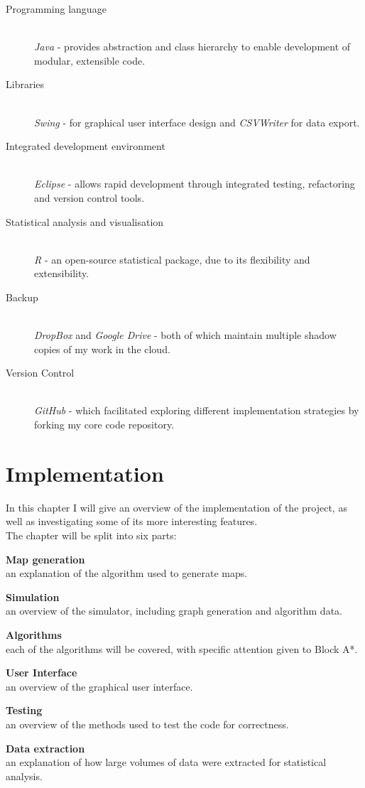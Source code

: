 \documentclass[12pt,notitlepage]{report}
\begin{document}
\begin{description}
  \item[Programming language] \hfill \\
  {\em Java} - provides abstraction and class hierarchy to enable development of modular, extensible code.
  \item[Libraries] \hfill \\
  {\em Swing} - for graphical user interface design and {\em CSVWriter} for data export.
  \item[Integrated development environment] \hfill \\
  {\em Eclipse} - allows rapid development through integrated testing, refactoring and version control tools.
  \item[Statistical analysis and visualisation] \hfill \\
  {\em R} - an open-source statistical package, due to its flexibility and extensibility.
  \item[Backup] \hfill \\
  {\em DropBox} and {\em Google Drive} - both of which maintain multiple shadow copies of my work in the cloud.
  \item[Version Control]\hfill \\
  {\em GitHub} - which facilitated exploring different implementation strategies by forking my core code repository.
  
\end{description}

\cleardoublepage
\chapter{Implementation}

In this chapter I will give an overview of the implementation of the project, as well as investigating some of its more interesting features.\\

\noindent
The chapter will be split into six parts: 
\begin{description}
  \item{\bf Map generation}\\ \hfill  an explanation of the algorithm used to generate maps.
  \item{\bf Simulation}\\ \hfill an overview of the simulator, including graph generation and algorithm data.
  \item{\bf Algorithms}\\ \hfill each of the algorithms will be covered, with specific attention given to Block A*.
  \item{\bf User Interface}\\ \hfill an overview of the graphical user interface. 
  \item{\bf Testing}\\ \hfill an overview of the methods used to test the code for correctness.
  \item{\bf Data extraction}\\ \hfill an explanation of how large volumes of data were extracted for statistical analysis.
\end{description}
\end{document}
